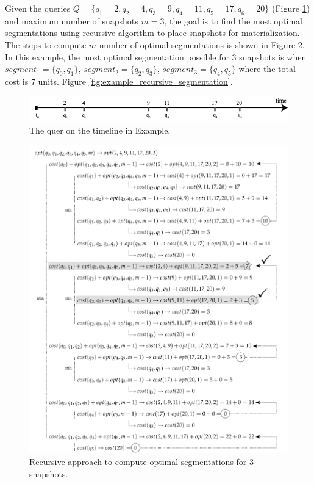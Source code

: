 			\begin{example}
				Given the queries $Q=\{q_1=2,q_2=4,q_3=9,q_4=11,q_5=17,q_6=20\}$ (Figure \ref{fig:example_recursive_queries}) and maximum number of snapshots $m=3$, the goal is to find the most optimal segmentations using recursive algorithm to place snapshots for materialization. The steps to compute $m$ number of optimal segmentations is shown in Figure \ref{fig:example_recursive_steps}. In this example, the most optimal segmentation possible for 3 snapshots is when $segment_1 = \{q_0,q_1\}$, $segment_2 = \{q_2,q_3\}$, $segment_3= \{q_4,q_5\}$ where the total cost is 7 units. Figure \ref{fig:example_recursive_segmentation}.
			\label{example:recursive_segmantation}
			\end{example}

			\begin{figure}[b]
				\centering
				\includegraphics[width=\textwidth]{figs/example_recursive_q.pdf}
				\caption{The quer on the timeline in Example.}
				\label{fig:example_recursive_queries}
			\end{figure}

			\begin{figure}
				\centering
				\includegraphics[width=\textwidth]{figs/recursion_example.pdf}
				\caption{Recursive approach to compute optimal segmentations for 3 snapshots.}
				\label{fig:example_recursive_steps}
			\end{figure}



